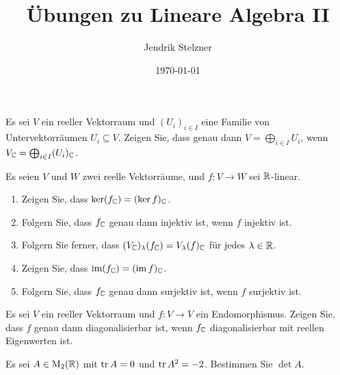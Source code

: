 \documentclass[a4paper,10pt]{scrartcl}
\title{Übungen zu Lineare Algebra II}
\author{Jendrik Stelzner}
\date{\today}
\begin{document}
\maketitle












\begin{question}
  Es sei $V$ ein reeller Vektorraum und $(U_i)_{i \in I}$ eine Familie von Untervektorräumen $U_i \subseteq V$.
  Zeigen Sie, dass genau dann $V = \bigoplus_{i \in I} U_i$, wenn $V_{\mathbb{C}} = \bigoplus_{i \in I} (U_i)_{\mathbb{C}}$.
\end{question}


\begin{question}
  Es seien $V$ und $W$ zwei reelle Vektorräume, und $f \colon V \to W$ sei $\mathbb{R}$-linear.
  \begin{enumerate}
    \item
      Zeigen Sie, dass $\ker (f_{\mathbb{C}}) = (\ker f)_{\mathbb{C}}$.
    \item
      Folgern Sie, dass $f_{\mathbb{C}}$ genau dann injektiv ist, wenn $f$ injektiv ist.
    \item
      Folgern Sie ferner, dass $(V_{\mathbb{C}})_\lambda(f_{\mathbb{C}}) = V_\lambda(f)_{\mathbb{C}}$ für jedes $\lambda \in \mathbb{R}$.
    \item
      Zeigen Sie, dass $\operatorname{im} (f_{\mathbb{C}}) = (\operatorname{im} f)_{\mathbb{C}}$.
    \item
      Folgern Sie, dass $f_{\mathbb{C}}$ genau dann surjektiv ist, wenn $f$ surjektiv ist.
  \end{enumerate}
\end{question}


\begin{question}
  Es sei $V$ ein reeller Vektorraum und $f \colon V \to V$ ein Endomorphismus.
  Zeigen Sie, dass $f$ genau dann diagonalisierbar ist, wenn $f_{\mathbb{C}}$ diagonalisierbar mit reellen Eigenwerten ist.
\end{question}












\begin{question}
  Es sei $A \in \operatorname{M}_2(\mathbb{R})$ mit $\operatorname{tr} A = 0$ und $\operatorname{tr} A^2 = -2$.
  Bestimmen Sie $\det A$.
\end{question}
\end{document}
